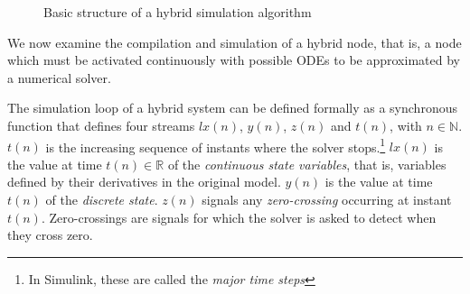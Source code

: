 \documentclass[11pt,titlepage,twoside]{report}
\newcommand{\lx}{\ensuremath{\mathit{lx}}}
\newcommand{\simulink}{{\sf Simulink}}
\newcommand{\bR}{\mathbb{R}}
\newcommand{\bN}{\mathbb{N}}
\begin{document}
\begin{figure}[t]
\centering%
\caption{Basic structure of a hybrid simulation algorithm\label{fig:simalgo}}
\end{figure}

We now examine the compilation and simulation of a hybrid node,
that is, a node which must be activated continuously with
possible ODEs to be approximated by a numerical solver.

The simulation loop of a hybrid system can be defined formally as a
synchronous function that defines four streams $\lx(n)$,
$y(n)$, $z(n)$ and $t(n)$, with $n \in \bN$.  $t(n)$ is the increasing
sequence of instants where the solver stops.\footnote{In \simulink,
  these are called the \emph{major time steps}} $\lx(n)$ is the value
at time $t(n) \in \bR$ of the \emph{continuous state variables}, that
is, variables defined by their derivatives in the original
model. $y(n)$ is the value at time $t(n)$ of the \emph{discrete
  state}.  $z(n)$ signals any \emph{zero-crossing} occurring at
instant $t(n)$. Zero-crossings are signals for which the solver is
asked to detect when they cross zero.
\end{document}
